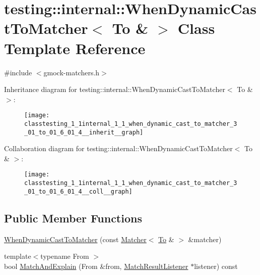 \hypertarget{classtesting_1_1internal_1_1_when_dynamic_cast_to_matcher_3_01_to_01_6_01_4}{}\section{testing\+:\+:internal\+:\+:When\+Dynamic\+Cast\+To\+Matcher$<$ To \& $>$ Class Template Reference}
\label{classtesting_1_1internal_1_1_when_dynamic_cast_to_matcher_3_01_to_01_6_01_4}


{\ttfamily \#include $<$gmock-\/matchers.\+h$>$}



Inheritance diagram for testing\+:\+:internal\+:\+:When\+Dynamic\+Cast\+To\+Matcher$<$ To \& $>$\+:
\nopagebreak
\begin{figure}[H]
\begin{center}
\leavevmode
\texttt{[image: classtesting\_1\_1internal\_1\_1\_when\_dynamic\_cast\_to\_matcher\_3\_01\_to\_01\_6\_01\_4\_\_inherit\_\_graph]}
\end{center}
\end{figure}


Collaboration diagram for testing\+:\+:internal\+:\+:When\+Dynamic\+Cast\+To\+Matcher$<$ To \& $>$\+:
\nopagebreak
\begin{figure}[H]
\begin{center}
\leavevmode
\texttt{[image: classtesting\_1\_1internal\_1\_1\_when\_dynamic\_cast\_to\_matcher\_3\_01\_to\_01\_6\_01\_4\_\_coll\_\_graph]}
\end{center}
\end{figure}
\subsection*{Public Member Functions}
\begin{DoxyCompactItemize}
\item 
\hyperlink{classtesting_1_1internal_1_1_when_dynamic_cast_to_matcher_3_01_to_01_6_01_4_a5f292f9497d2da8484082cba38053908}{When\+Dynamic\+Cast\+To\+Matcher} (const \hyperlink{classtesting_1_1_matcher}{Matcher}$<$ \hyperlink{classtesting_1_1internal_1_1_to}{To} \& $>$ \&matcher)
\item 
{\footnotesize template$<$typename From $>$ }\\bool \hyperlink{classtesting_1_1internal_1_1_when_dynamic_cast_to_matcher_3_01_to_01_6_01_4_a5459ff45c7b687d42545490226c2f7b2}{Match\+And\+Explain} (From \&from, \hyperlink{classtesting_1_1_match_result_listener}{Match\+Result\+Listener} $\ast$listener) const 
\end{DoxyCompactItemize}
